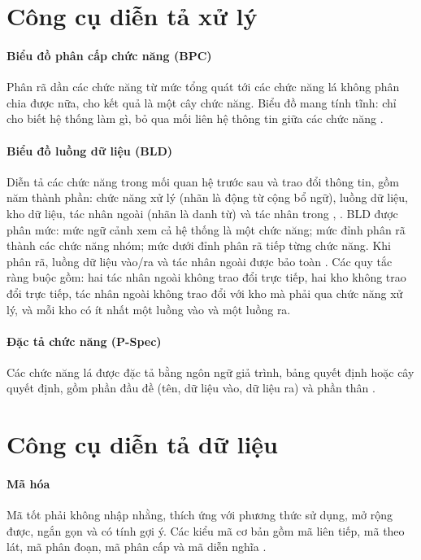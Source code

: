 \section{Công cụ diễn tả xử lý}
\label{sec:congcuxuly}

\paragraph{Biểu đồ phân cấp chức năng (BPC)} Phân rã dần các chức năng từ mức tổng quát tới các chức năng lá không phân chia được nữa, cho kết quả là một cây chức năng. Biểu đồ mang tính tĩnh: chỉ cho biết hệ thống làm gì, bỏ qua mối liên hệ thông tin giữa các chức năng \cite[Ch.~2]{tung_qlhttt}.

\paragraph{Biểu đồ luồng dữ liệu (BLD)} Diễn tả các chức năng trong mối quan hệ trước sau và trao đổi thông tin, gồm năm thành phần: chức năng xử lý (nhãn là động từ cộng bổ ngữ), luồng dữ liệu, kho dữ liệu, tác nhân ngoài (nhãn là danh từ) và tác nhân trong \cite[Ch.~2]{tung_qlhttt}, \cite{demarco1978}. BLD được phân mức: mức ngữ cảnh xem cả hệ thống là một chức năng; mức đỉnh phân rã thành các chức năng nhóm; mức dưới đỉnh phân rã tiếp từng chức năng. Khi phân rã, luồng dữ liệu vào/ra và tác nhân ngoài được bảo toàn \cite[Ch.~5]{tung_qlhttt}. Các quy tắc ràng buộc gồm: hai tác nhân ngoài không trao đổi trực tiếp, hai kho không trao đổi trực tiếp, tác nhân ngoài không trao đổi với kho mà phải qua chức năng xử lý, và mỗi kho có ít nhất một luồng vào và một luồng ra.

\paragraph{Đặc tả chức năng (P-Spec)} Các chức năng lá được đặc tả bằng ngôn ngữ giả trình, bảng quyết định hoặc cây quyết định, gồm phần đầu đề (tên, dữ liệu vào, dữ liệu ra) và phần thân \cite[Ch.~2]{tung_qlhttt}.

\section{Công cụ diễn tả dữ liệu}
\label{sec:congcudulieu}

\paragraph{Mã hóa} Mã tốt phải không nhập nhằng, thích ứng với phương thức sử dụng, mở rộng được, ngắn gọn và có tính gợi ý. Các kiểu mã cơ bản gồm mã liên tiếp, mã theo lát, mã phân đoạn, mã phân cấp và mã diễn nghĩa \cite[Ch.~3]{tung_qlhttt}.

